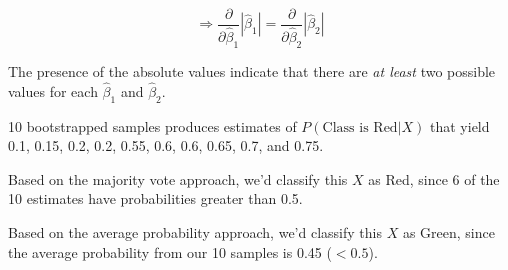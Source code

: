 \documentclass[11pt]{exam} %
\newenvironment{code}%
   {\par\noindent\adjustbox{margin=1ex,bgcolor=shadecolor,margin=0ex \medskipamount}\bgroup\minipage\linewidth\verbatim}%
   {\endverbatim\endminipage\egroup}
\begin{document}
\begin{questions}
\begin{parts}
 
$$ \Rightarrow \frac{\partial}{\partial \hat{\beta}_1} \left| \hat{\beta}_1 \right| = \frac{\partial}{\partial \hat{\beta}_2} \left| \hat{\beta}_2 \right|$$

The presence of the absolute values indicate that there are \textit{at least} two possible values for each $\hat{\beta}_1$ and $\hat{\beta}_2$.






\end{parts}




10 bootstrapped samples produces estimates of $P\left( \textrm{Class is Red}|X  \right)$ that yield 0.1, 0.15, 0.2, 0.2, 0.55, 0.6, 0.6, 0.65, 0.7, and 0.75.

Based on the majority vote approach, we'd classify this $X$ as Red, since 6 of the 10 estimates have probabilities greater than 0.5.

Based on the average probability approach, we'd classify this $X$ as Green, since the average probability from our 10 samples is 0.45 ($<0.5$).





\end{questions}
\end{document}
